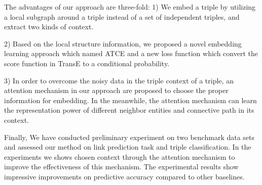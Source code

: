The advantages of our approach are three-fold:
1) We embed a triple by utilizing a local subgraph around a triple instead of a set of independent triples, and extract two kinds of context.

2) Based on the local structure information, we proposed a novel embedding learning approach which named ATCE and a new loss function which convert the score function in TransE to a conditional probability.

3) In order to overcome the noisy data in the triple context of a triple, an attention mechanism in our approach are proposed to choose the proper information for embedding. In the meanwhile, the attention mechanism can learn the representation power of different neighbor entities and connective path in its context.

Finally, We have conducted preliminary experiment on two benchmark data sets and assessed our method on link prediction task and triple classification. In the experiments we shows chosen context through the attention mechanism to improve the effectiveness of this mechanism. The experimental results show impressive improvements on predictive accuracy compared to other baselines.

